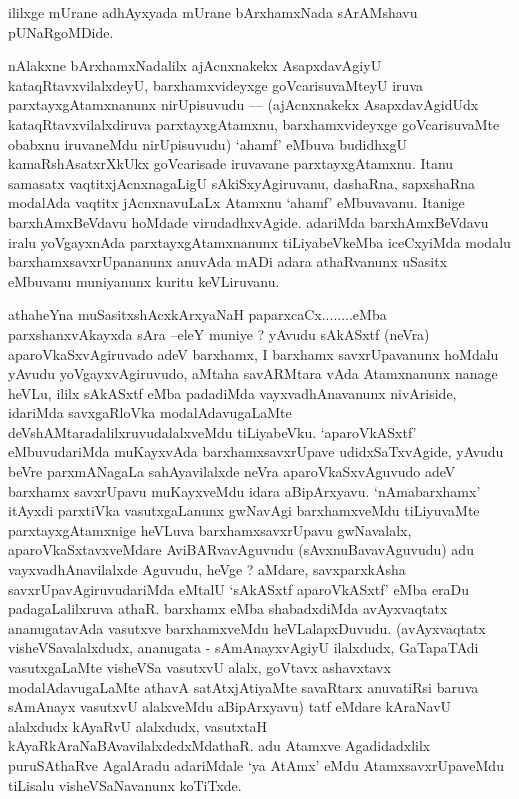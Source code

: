 \centerline{ililxge mUrane adhAyxyada mUrane bArxhamxNada sArAMshavu pUNaRgoMDide.}


\begin{artha}
nAlakxne bArxhamxNadalilx ajAcnxnakekx AsapxdavAgiyU kataqRtavxvilalxdeyU, barxhamxvideyxge goVcarisuvaMteyU iruva parxtayxgAtamxnanunx nirUpisuvudu --- (ajAcnxnakekx AsapxdavAgidUdx kataqRtavxvilalxdiruva parxtayxgAtamxnu, barxhamxvideyxge goVcarisuvaMte obabxnu iruvaneMdu nirUpisuvudu) `ahamf' eMbuva budidhxgU kamaRshAsatxrXkUkx  goVcarisade iruvavane parxtayxgAtamxnu. Itanu samasatx vaqtitxjAcnxnagaLigU sAkiSxyAgiruvanu, dashaRna, sapxshaRna modalAda vaqtitx jAcnxnavuLaLx Atamxnu `ahamf' eMbuvavanu. Itanige barxhAmxBeVdavu hoMdade virudadhxvAgide. adariMda barxhAmxBeVdavu iralu yoVgayxnAda parxtayxgAtamxnanunx tiLiyabeVkeMba iceCxyiMda modalu barxhamxsavxrUpananunx anuvAda mADi adara athaRvanunx uSasitx eMbuvanu muniyanunx kuritu keVLiruvanu.
\end{artha}


\begin{artha}
athaheYna muSasitxshAcxkArxyaNaH paparxcaCx........eMba parxshanxvAkayxda sAra --eleY muniye ? yAvudu sAkASxtf (neVra) aparoVkaSxvAgiruvado adeV barxhamx, I barxhamx savxrUpavanunx hoMdalu yAvudu yoVgayxvAgiruvudo, aMtaha savARMtara vAda Atamxnanunx nanage heVLu, ililx sAkASxtf eMba padadiMda vayxvadhAnavanunx nivAriside, idariMda savxgaRloVka modalAdavugaLaMte deVshAMtaradalilxruvudalalxveMdu tiLiyabeVku. `aparoVkASxtf' eMbuvudariMda muKayxvAda barxhamxsavxrUpave udidxSaTxvAgide, yAvudu beVre parxmANagaLa sahAyavilalxde neVra aparoVkaSxvAguvudo adeV barxhamx savxrUpavu muKayxveMdu idara aBipArxyavu. `nAmabarxhamx' itAyxdi parxtiVka vasutxgaLanunx gwNavAgi barxhamxveMdu tiLiyuvaMte parxtayxgAtamxnige heVLuva barxhamxsavxrUpavu gwNavalalx, aparoVkaSxtavxveMdare AviBARvavAguvudu (sAvxnuBavavAguvudu) adu vayxvadhAnavilalxde Aguvudu, heVge ? aMdare, savxparxkAsha savxrUpavAgiruvudariMda eMtalU `sAkASxtf aparoVkASxtf' eMba eraDu padagaLalilxruva athaR. barxhamx eMba shabadxdiMda avAyxvaqtatx ananugatavAda vasutxve barxhamxveMdu heVLalapxDuvudu. (avAyxvaqtatx visheVSavalalxdudx, ananugata - sAmAnayxvAgiyU ilalxdudx, GaTapaTAdi vasutxgaLaMte visheVSa vasutxvU alalx, goVtavx ashavxtavx modalAdavugaLaMte athavA satAtxjAtiyaMte savaRtarx anuvatiRsi baruva sAmAnayx vasutxvU alalxveMdu aBipArxyavu) tatf eMdare kAraNavU alalxdudx kAyaRvU alalxdudx, vasutxtaH kAyaRkAraNaBAvavilalxdedxMdathaR. adu Atamxve Agadidadxlilx puruSAthaRve AgalAradu adariMdale `ya AtAmx' eMdu AtamxsavxrUpaveMdu tiLisalu visheVSaNavanunx koTiTxde.
\end{artha}

